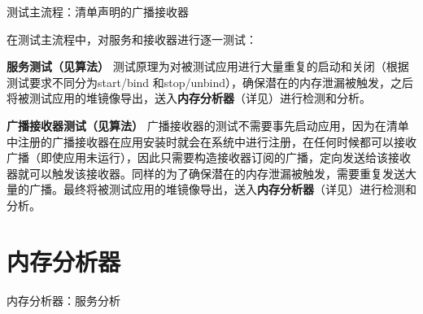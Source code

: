 \begin{algorithm}
	\caption{测试主流程：清单声明的广播接收器}
	\label{alg:receiver}
	\begin{algorithmic}[1]
			\ENDWHILE
		\ENDFOR
	\end{algorithmic}
\end{algorithm}

在测试主流程中，对服务和接收器进行逐一测试：

\textbf{服务测试（见算法\redbf{\ref{alg:service}}） }  测试原理为对被测试应用进行大量重复的启动和关闭（根据测试要求不同分为start/bind 和stop/unbind），确保潜在的内存泄漏被触发，之后将被测试应用的堆镜像导出，送入\textbf{内存分析器}（详见\redbf{\ref{memory analyser}}）进行检测和分析。

\textbf{广播接收器测试（见算法\redbf{\ref{alg:receiver}}） }
广播接收器的测试不需要事先启动应用，因为在清单中注册的广播接收器在应用安装时就会在系统中进行注册，在任何时候都可以接收广播（即使应用未运行），因此只需要构造接收器订阅的广播，定向发送给该接收器就可以触发该接收器。同样的为了确保潜在的内存泄漏被触发，需要重复发送大量的广播。最终将被测试应用的堆镜像导出，送入\textbf{内存分析器}（详见\redbf{\ref{memory analyser}}）进行检测和分析。
\section{内存分析器}\label{memory analyser}

\begin{algorithm}
	\caption{内存分析器：服务分析}
	\label{alg:memory analyser:service}
	\begin{algorithmic}[1]
					\ELSE
					\ENDIF
				\ENDIF
			\ENDIF
		\ENDFOR
	\end{algorithmic}
\end{algorithm}

